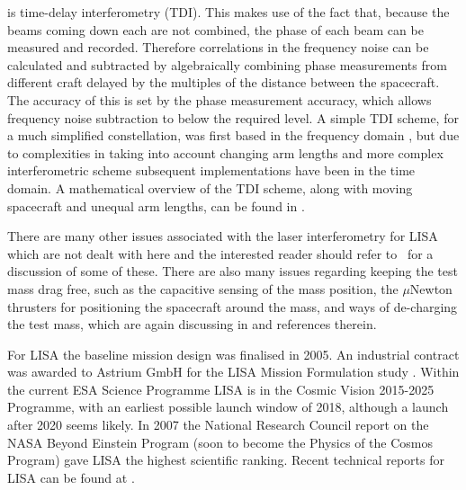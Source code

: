 \documentclass{article}
\begin{document}
is time-delay interferometry (TDI). This makes use of the fact that, because the 
beams coming down each are not combined, the phase of each beam can be measured 
and recorded. Therefore correlations in the frequency noise can be calculated 
and subtracted by algebraically combining phase measurements from different 
craft delayed by the multiples of the distance between the spacecraft. The 
accuracy of this is set by the phase measurement accuracy, which allows 
frequency noise subtraction to below the required level. A simple TDI scheme, 
for a much simplified constellation, was first based in the frequency domain 
\cite{Giampieri}, but due to complexities in taking into account changing arm 
lengths and more complex interferometric scheme subsequent implementations have 
been in the time domain. A mathematical overview of the TDI scheme, along with 
moving spacecraft and unequal arm lengths, can be found in \cite{Tinto:2005}. 

There are many other issues associated with the laser interferometry for LISA
which are not dealt with here and the interested reader should refer
to~\cite{Houghetal, Jennrich:2009} for a discussion of some of these. There are 
also many issues regarding keeping the test mass drag free, such as the 
capacitive sensing of the mass position, the $\mu$Newton thrusters for 
positioning the spacecraft around the mass, and ways of de-charging the test 
mass, which are again discussing in \cite{Jennrich:2009} and references therein.

For LISA the baseline mission design was finalised in 2005. An industrial 
contract was awarded to Astrium GmbH for the LISA Mission Formulation study 
\cite{Johann:2008}. Within the current ESA Science Programme LISA is in the 
Cosmic Vision 2015-2025 Programme, with an earliest possible launch window of 
2018, although a launch after 2020 seems likely. In 2007 the National Research 
Council report on the NASA Beyond Einstein Program (soon to become the Physics 
of the Cosmos Program) gave LISA the highest scientific ranking. Recent 
technical reports for LISA can be found at 
\cite{LISATechReports}.
\end{document}

